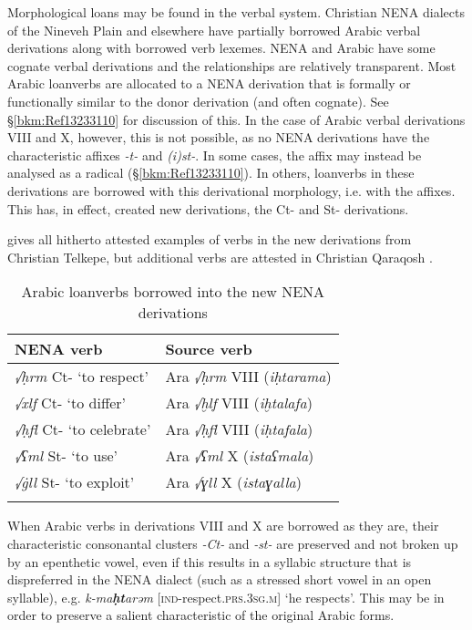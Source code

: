 \documentclass[output=paper]{langsci/langscibook}
\begin{document}
Morphological loans may be found in the verbal system. Christian NENA dialects of the Nineveh Plain and elsewhere have partially borrowed Arabic verbal derivations along with borrowed verb lexemes. NENA and Arabic have some cognate verbal derivations and the relationships are relatively transparent. Most Arabic loanverbs are allocated to a NENA derivation that is formally or functionally similar to the donor derivation (and often cognate). See §\ref{bkm:Ref13233110} for discussion of this. In the case of Arabic verbal derivations VIII and X, however, this is not possible, as no NENA derivations have the characteristic affixes \textit{{}-t-} and \textit{(i)st-}. In some cases, the affix may instead be analysed as a radical (§\ref{bkm:Ref13233110}). In others, loanverbs in these derivations are borrowed with this derivational morphology, i.e. with the affixes. This has, in effect, created new derivations, the Ct- and St- derivations.

 gives all hitherto attested examples of verbs in the new derivations from Christian Telkepe, but additional verbs are attested in Christian Qaraqosh \citep[130]{Khan2002}.

\begin{table}
\caption{Arabic loanverbs borrowed into the new NENA derivations\label{tab:coghill:1}}
\begin{tabularx}{.75\textwidth}{QQ}
\lsptoprule
{NENA verb} & {Source verb}\\\midrule
{\textit{√ḥrm} Ct- ‘to respect’} & {Ara \textit{√ḥrm} VIII (\textit{iḥtarama})}\\
\textit{√xlf} Ct- ‘to differ’ & {Ara \textit{√ḫlf} VIII (\textit{iḫtalafa})}\\
{\textit{√ḥfl} Ct- ‘to celebrate’} & {Ara \textit{√ḥfl} VIII (\textit{iḥtafala})}\\
{\textit{√ʕml} St- ‘to use’} & {Ara \textit{√ʕml} X (\textit{istaʕmala})}\\
\textit{√\.gll} St- ‘to exploit’ & {Ara \textit{√ɣll} X (\textit{istaɣalla})}\\
\lspbottomrule
\end{tabularx}
\end{table}

When Arabic verbs in derivations VIII and X are borrowed as they are, their characteristic consonantal clusters \textit{{}-Ct-} and \textit{{}-st-} are preserved and not broken up by an epenthetic vowel, even if this results in a syllabic structure that is dispreferred in the NENA dialect (such as a stressed short vowel in an open syllable), e.g. \textit{k-ma}\kern -0.5pt\textbf{\textit{ḥt}}\kern -1pt\textit{arəm} [\textsc{ind}\nobreakdash-respect.\textsc{prs.}3\textsc{sg.m}] ‘he respects’. This may be in order to preserve a salient characteristic of the original Arabic forms.
\end{document}
